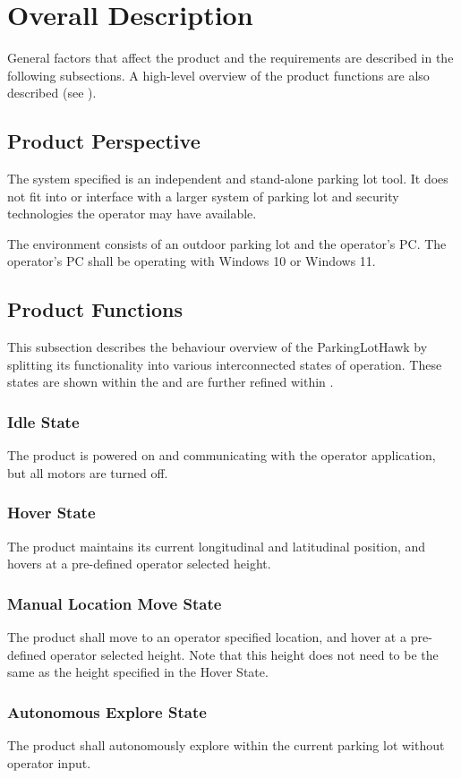 \documentclass{article}
\begin{document}
\section{Overall Description}
\label{sec:Desc}
General factors that affect the product and the requirements are described in the following subsections. A high-level overview of the product functions are also described (see ). 
\subsection{Product Perspective}
The system specified is an independent and stand-alone parking lot tool. It does not fit into or interface with a larger system of parking lot and security technologies the operator may have available. 

The environment consists of an outdoor parking lot and the operator's PC. The operator's PC shall be operating with Windows 10 or Windows 11.

\subsection{Product Functions}
\label{subsec:ProdFunc}
This subsection describes the behaviour overview of the ParkingLotHawk by splitting its functionality into various interconnected states of operation. These states are shown within the  and are further refined within . 
\subsubsection{Idle State}
\label{Idle State}
The product is powered on and communicating with the operator application, but all motors are turned off. 
\subsubsection{Hover State}
\label{Hover State}
The product maintains its current longitudinal and latitudinal position, and hovers at a pre-defined operator selected height. 
\subsubsection{Manual Location Move State}
\label{Manual Location Move State}
The product shall move to an operator specified location, and hover at a pre-defined operator selected height. Note that this height does not need to be the same as the height specified in the Hover State. 
\subsubsection{Autonomous Explore State}
\label{Autonomous Explore State}
The product shall autonomously explore within the current parking lot without operator input. 
\end{document}
